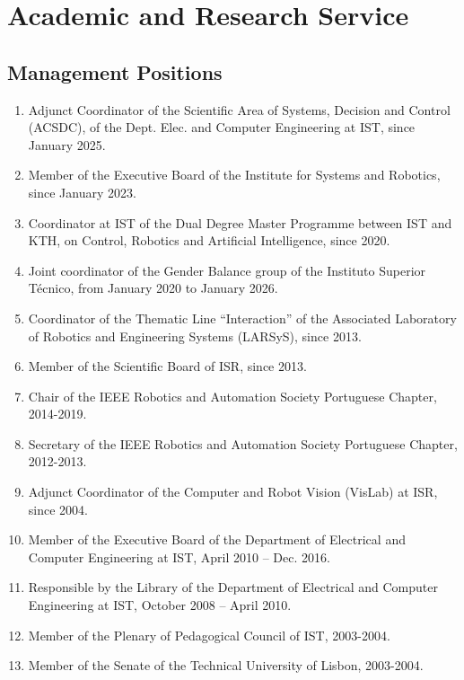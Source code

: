 \section{Academic and Research
Service}\label{academic-and-research-service-1}

\subsection{Management Positions}\label{management-positions}

\begin{enumerate}
\def\labelenumi{\arabic{enumi}.}
\item
  Adjunct Coordinator of the Scientific Area of Systems, Decision and
  Control (ACSDC), of the Dept. Elec. and Computer Engineering at IST,
  since January 2025.
\item
  Member of the Executive Board of the Institute for Systems and
  Robotics, since January 2023.
\item
  Coordinator at IST of the Dual Degree Master Programme between IST and
  KTH, on Control, Robotics and Artificial Intelligence, since 2020.
\item
  Joint coordinator of the Gender Balance group of the Instituto
  Superior Técnico, from January 2020 to January 2026.
\item
  Coordinator of the Thematic Line ``Interaction'' of the Associated
  Laboratory of Robotics and Engineering Systems (LARSyS), since 2013.
\item
  Member of the Scientific Board of ISR, since 2013.
\item
  Chair of the IEEE Robotics and Automation Society Portuguese Chapter,
  2014-2019.
\item
  Secretary of the IEEE Robotics and Automation Society Portuguese
  Chapter, 2012-2013.
\item
  Adjunct Coordinator of the Computer and Robot Vision (VisLab) at ISR,
  since 2004.
\item
  Member of the Executive Board of the Department of Electrical and
  Computer Engineering at IST, April 2010 -- Dec. 2016.
\item
  Responsible by the Library of the Department of Electrical and
  Computer Engineering at IST, October 2008 -- April 2010.
\item
  Member of the Plenary of Pedagogical Council of IST, 2003-2004.
\item
  Member of the Senate of the Technical University of Lisbon, 2003-2004.
\end{enumerate}

